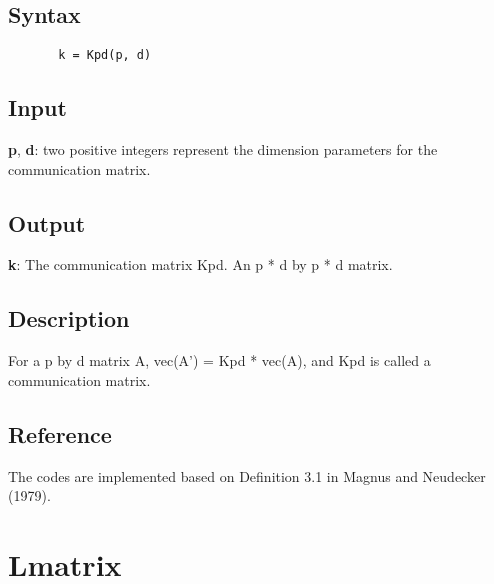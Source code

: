 \documentclass[a4paper,11pt,openany]{memoir}
\begin{document}
\subsection*{Syntax}


\begin{verbatim}       k = Kpd(p, d)\end{verbatim}
    

\subsection*{Input}

\begin{par}
\textbf{p}, \textbf{d}: two positive integers represent the dimension parameters for the communication matrix.
\end{par} \vspace{1em}


\subsection*{Output}

\begin{par}
\textbf{k}: The communication matrix Kpd. An p * d by p * d matrix.
\end{par} \vspace{1em}


\subsection*{Description}

\begin{par}
For a p by d matrix A, vec(A') = Kpd * vec(A), and Kpd is called a communication matrix.
\end{par} \vspace{1em}


\subsection*{Reference}

\begin{par}
The codes are implemented based on Definition 3.1 in Magnus and Neudecker (1979).
\end{par} \vspace{1em}

\newpage

\rmfamily
\color{black}\section{Lmatrix}
\end{document}
